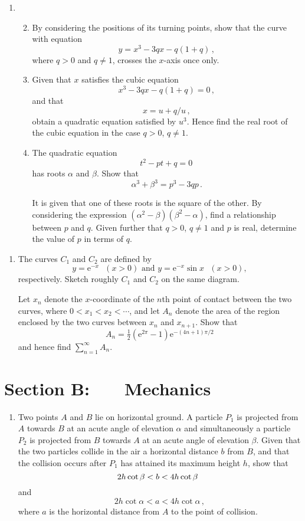 \documentclass[a4, 11pt]{report}
\newlength{\qspace}
\newcounter{qnumber}
\newenvironment{question}%
 {\vspace{\qspace}
  \begin{enumerate}[\bfseries 1\quad][10]%
    \setcounter{enumi}{\value{qnumber}}%
    \item%
 }
{
  \end{enumerate}
  \filbreak
  \stepcounter{qnumber}
 }
\newenvironment{questionparts}[1][1]%
 {
  \begin{enumerate}[\bfseries (i)]%
    \setcounter{enumii}{#1}
    \addtocounter{enumii}{-1}
    \setlength{\itemsep}{5mm}
    \setlength{\parskip}{8pt}
 }
 {
  \end{enumerate}
 }
\def\e{{\mathrm e}}
\begin{document}
\begin{question}
\begin{questionparts}
\item 
By considering the positions of its turning points, show that  the curve
with equation
\[
y=x^3-3qx-q(1+q)\,,
\]
where $q>0$ and $q\ne1$, crosses the $x$-axis once only.

\item 
Given that $x$ satisfies the cubic equation
\[
x^3-3qx-q(1+q)=0\,,
\]
and that
\[
x=u+q/u\,,
\]
obtain  a quadratic equation
satisfied by $u^3$.
Hence find the real root of the cubic equation in the case $q>0$, $q\ne1$.

\item The quadratic equation 
\[
t^2 -pt +q =0\,
\]
 has roots $\alpha $ and $\beta$. Show that
\[
\alpha^3+\beta^3 = p^3 -3qp\,.
\]

It is given that  one of these roots is the square of the other.
By considering the expression $(\alpha^2 -\beta)(\beta^2-\alpha)$,
find a relationship between                    $p$ and $q$.
Given further that  $q>0$, $q\ne1$ and $p$ is real,
determine  the value of $p$ in terms of $q$.
\end{questionparts}  
\end{question}
		
\begin{question}
The curves $C_1$ and $C_2$ are defined by 
\[
y= \e^{-x} \ \ \ (x>0)  \text{ \ \ \ and \ \ \ }
y= \e^{-x}\sin x \ \ \ (x>0),
\]
respectively. Sketch roughly $C_1$ and $C_2$ on the same diagram.

Let $x_n$ denote the $x$-coordinate of the $n$th point of contact
between the two curves, where $0<x_1<x_2< \cdots$, and let
$A_n$ denote the area of the region enclosed by the two 
curves between $x_n$ and $x_{n+1}$. Show that
\[
A_n = \tfrac12(\e^{2\pi}-1) \e^{-(4n+1)\pi/2}
\]
and hence find $\displaystyle \sum_{n=1}^\infty A_n$.
\end{question}	
		

		
	
\newpage
\section*{Section B: \ \ \ Mechanics}


	
\begin{question}
Two points $A$ and $B$ lie on  horizontal ground.
  A particle $P_1$ is projected from $A$ towards $B$
at an acute angle of elevation $\alpha$  
and simultaneously
a particle $P_2$ is projected from $B$ towards $A$ 
at an acute angle of elevation $\beta$.
Given that the  two particles collide in the air
a horizontal distance $b$ from $B$,
and that the collision occurs after $P_1$
has attained its maximum height $h$, show that
\[
2h \cot\beta < b < 4h \cot\beta \hphantom{\,,}
\]
and
\[
2h \cot\alpha < a < 4h \cot\alpha
\,,
\]
where $a$ is the horizontal distance from $A$
to the point of collision.
	\end{question}
	
\end{document}
